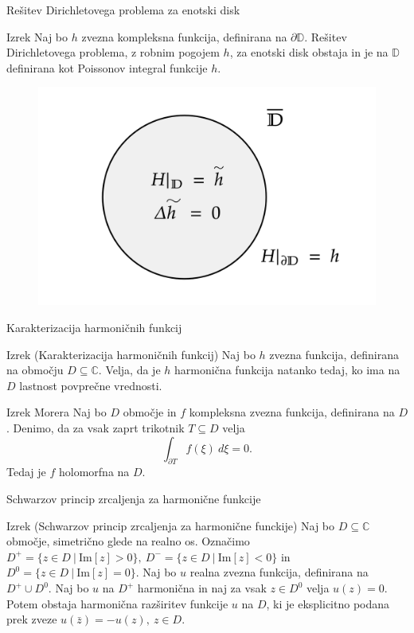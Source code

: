 \documentclass{beamer}
\theoremstyle{definition}
\theoremstyle{definition}
\begin{document}
\begin{frame}{Rešitev Dirichletovega problema za enotski disk}
    \begin{alertblock}{Izrek}
        Naj bo $h$ zvezna kompleksna funkcija, definirana na $\partial \mathbb{D}$. Rešitev Dirichletovega problema, z robnim pogojem $h$, za enotski disk obstaja in je na $\mathbb{D}$ definirana kot Poissonov integral funkcije $h$.
    \end{alertblock}
    \begin{figure}
    \begin{center}
      \includegraphics[width=0.8 \textwidth]{dirichlet_resitev.png}
    \end{center}
    \end{figure}
\end{frame}

\begin{frame}{Karakterizacija harmoničnih funkcij}
    \begin{alertblock}{Izrek (Karakterizacija harmoničnih funkcij)}
        Naj bo $h$ zvezna funkcija, definirana na območju $D \subseteq \mathbb{C}$. Velja, da je $h$ harmonična funkcija natanko tedaj, ko ima na $D$ lastnost povprečne vrednosti.
    \end{alertblock}
    \pause
    \begin{alertblock}{Izrek Morera}
        Naj bo $D$ območje in $f$ kompleksna zvezna funkcija, definirana na $D$. 
        Denimo, da za vsak zaprt trikotnik $T \subseteq D$ velja 
        $$
        \int_{\partial T} {f(\xi)~d\xi} = 0.
        $$
        Tedaj je $f$ holomorfna na $D$.
    \end{alertblock}
\end{frame}

\begin{frame}{Schwarzov princip zrcaljenja za harmonične funkcije}
    \begin{exampleblock}{Izrek (Schwarzov princip zrcaljenja za harmonične funckije)}
        Naj bo $D \subseteq \mathbb{C}$ območje, simetrično glede na realno os. 
        Označimo $D^{+} = \{z \in D~|~\text{Im}[z] > 0\},~D^{-} = \{z \in D~|~\text{Im}[z] < 0\}$ in $D^{0} = \{z \in D~|~\text{Im}[z] = 0\}$.
        Naj bo $u$ realna zvezna funkcija, definirana na $D^{+} \cup D^0$. Naj bo $u$ na $D^{+}$ harmonična in naj za vsak $z \in D^0$ velja $u(z) = 0$.
        Potem obstaja harmonična razširitev funkcije $u$ na $D$, ki je eksplicitno podana prek zveze $u(\bar{z}) = - u(z),~z \in D$.
    \end{exampleblock}
\end{frame}
\end{document}

